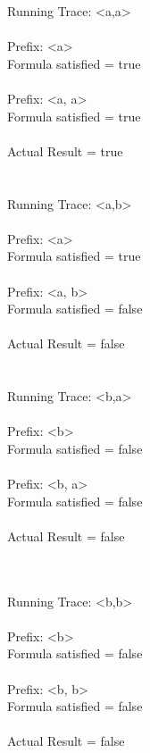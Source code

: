\noindent Running Trace: \textless a,a\textgreater\\
\\
  Prefix: \textless a\textgreater\\
  Formula satisfied = true\\
\\
  Prefix: \textless a, a\textgreater\\
  Formula satisfied = true\\
\\
  Actual Result = true\\
\\
\\
Running Trace: \textless a,b\textgreater\\
\\
  Prefix: \textless a\textgreater\\
  Formula satisfied = true\\
\\
  Prefix: \textless a, b\textgreater\\
  Formula satisfied = false\\
\\
  Actual Result = false\\
\\
\\
Running Trace: \textless b,a\textgreater\\
\\
  Prefix: \textless b\textgreater\\
  Formula satisfied = false\\
\\
  Prefix: \textless b, a\textgreater\\
  Formula satisfied = false\\
\\
  Actual Result = false\\
\\
\\
\newpage

\noindent Running Trace: \textless b,b\textgreater\\
\\
  Prefix: \textless b\textgreater\\
  Formula satisfied = false\\
\\
  Prefix: \textless b, b\textgreater\\
  Formula satisfied = false\\
\\
  Actual Result = false\\

